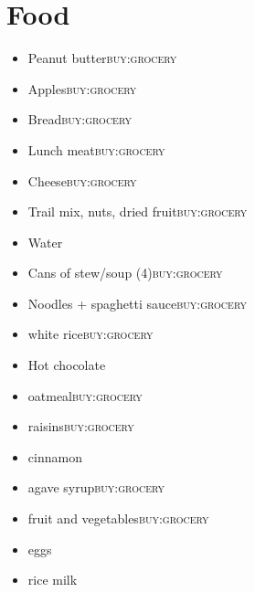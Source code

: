 \documentclass[11pt]{article}
\begin{document}
\section*{Food}
\label{sec-4}
\begin{itemize}
\item Peanut butter\hfill{}\textsc{buy:grocery}
\label{sec-4-1}
\item Apples\hfill{}\textsc{buy:grocery}
\label{sec-4-2}
\item Bread\hfill{}\textsc{buy:grocery}
\label{sec-4-3}
\item Lunch meat\hfill{}\textsc{buy:grocery}
\label{sec-4-4}
\item Cheese\hfill{}\textsc{buy:grocery}
\label{sec-4-5}
\item Trail mix, nuts, dried fruit\hfill{}\textsc{buy:grocery}
\label{sec-4-6}
\item Water
\label{sec-4-7}
\item Cans of stew/soup (4)\hfill{}\textsc{buy:grocery}
\label{sec-4-8}
\item Noodles + spaghetti sauce\hfill{}\textsc{buy:grocery}
\label{sec-4-9}
\item white rice\hfill{}\textsc{buy:grocery}
\label{sec-4-10}
\item Hot chocolate
\label{sec-4-11}
\item oatmeal\hfill{}\textsc{buy:grocery}
\label{sec-4-12}
\item raisins\hfill{}\textsc{buy:grocery}
\label{sec-4-13}
\item cinnamon
\label{sec-4-14}
\item agave syrup\hfill{}\textsc{buy:grocery}
\label{sec-4-15}
\item fruit and vegetables\hfill{}\textsc{buy:grocery}
\label{sec-4-16}
\item eggs
\label{sec-4-17}
\item rice milk
\label{sec-4-18}
\end{itemize}
\end{document}
